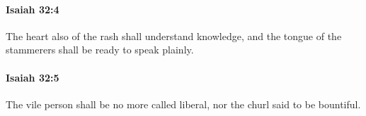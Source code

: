 		\paragraph{Isaiah 32:4} %
			\label{ISAIAH-32-4}

			The heart also of the rash shall understand knowledge, and the tongue of the stammerers shall be ready to speak plainly.


		\paragraph{Isaiah 32:5} %
			\label{ISAIAH-32-5}

			The vile person shall be no more called liberal, nor the churl said to be bountiful.



